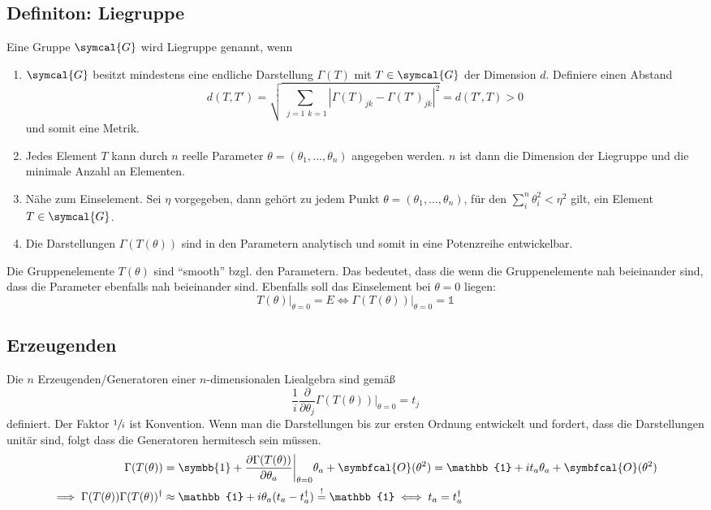 \documentclass[
  captions=tableheading,  %
  titlepage=firstiscover, %
]{scrartcl}
\begin{document}
\subsection{Definiton: Liegruppe}
Eine Gruppe $\symcal{G}$ wird Liegruppe genannt, wenn
\begin{enumerate}
  \item $\symcal{G}$ besitzt mindestens eine endliche Darstellung $\Gamma(T)$ mit $T \in \symcal{G}$ der Dimension 
  $d$. 
  Definiere einen Abstand 
    \begin{equation*}
      d(T,T') = \sqrt{\sum_{\substack{j=1}{k=1}} \left | \Gamma(T)_{jk} - \Gamma(T')_{jk} \right |^2  } = d(T',T) > 0
    \end{equation*}
    und somit eine Metrik.
  \item Jedes Element $T$ kann durch $n$ reelle Parameter $\theta = (\theta_1, \ldots, \theta_n)$ angegeben werden.
    $n$ ist dann die Dimension der Liegruppe und die minimale Anzahl an Elementen.
  \item Nähe zum Einselement. Sei $\eta$ vorgegeben, dann gehört zu jedem Punkt $\theta =  (\theta_1, \ldots, \theta_n)$,
    für den $\sum_i^n \theta_i^2 < \eta^2$ gilt, ein Element $T \in \symcal{G}$.
  \item Die Darstellungen $\Gamma(T(\theta))$ sind in den Parametern analytisch und somit in eine Potenzreihe entwickelbar.
\end{enumerate}
Die Gruppenelemente $T(\theta)$ sind \enquote{smooth} bzgl. den Parametern. 
Das bedeutet, dass die wenn die Gruppenelemente nah beieinander sind, dass die Parameter ebenfalls nah beieinander sind.
Ebenfalls soll das Einselement bei $\theta = 0$ liegen:
\begin{equation*}
  T(\theta)\big |_{\theta = 0} = E \iff \Gamma(T(\theta)) \big |_{\theta = 0} = \mathbb{1}
\end{equation*}
\subsection{Erzeugenden}
Die $n$ Erzeugenden/Generatoren einer $n$-dimensionalen Liealgebra sind gemäß 
\begin{equation*}
  \frac{1}{i} \frac{\partial}{\partial \theta_j} \Gamma(T(\theta)) \biggr |_{\theta = 0} = t_j \label{eqn:gen}
\end{equation*}
definiert. 
Der Faktor $\sfrac{1}{i}$ ist Konvention.
Wenn man die Darstellungen bis zur ersten Ordnung entwickelt und fordert, dass die Darstellungen 
unitär sind, folgt dass die Generatoren hermitesch sein müssen. 
\begin{align*}
  \Gamma(T(\theta)) &= \symbb{1} + \frac{\partial \Gamma(T(\theta))}{\partial \theta_a} \biggr |_{\theta = 0} \theta_a + \symbfcal{O}(\theta^2) 
  = \mathbb{1} + i t_a \theta_a + \symbfcal{O}(\theta^2) \\
  \implies \Gamma(T(\theta))\Gamma(T(\theta))^{\dagger}  &\approx \mathbb{1} + i \theta_a (t_a - t_a^{\dagger}) \stackrel{!}{=} \mathbb{1} \iff t_a = t_a^{\dagger}
\end{align*}
\end{document}
